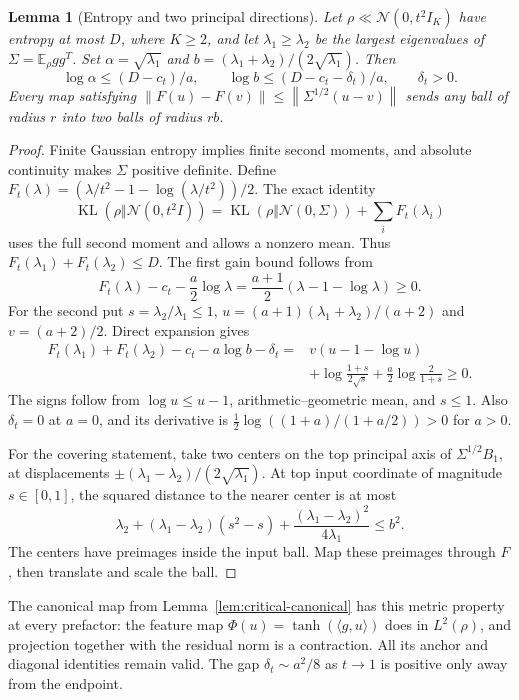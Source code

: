 \documentclass[11pt]{article}
\newtheorem{lemma}[theorem]{Lemma}
\theoremstyle{remark}
\newcommand{\E}{\mathbb E}
\newcommand{\KL}{\operatorname{KL}}
\newcommand{\norm}[1]{\left\lVert #1\right\rVert}
\begin{document}
\begin{lemma}[Entropy and two principal directions]
\label{lem:prefactor-spectral}
Let $\rho\ll\mathcal N(0,t^2I_K)$ have entropy at most $D$,
where $K\ge2$, and let $\lambda_1\ge\lambda_2$ be the largest
eigenvalues of $\Sigma=\E_\rho gg^T$. Set
$\alpha=\sqrt{\lambda_1}$ and
$b=(\lambda_1+\lambda_2)/(2\sqrt{\lambda_1})$. Then
\[
 \log\alpha\le(D-c_t)/a,\qquad
 \log b\le(D-c_t-\delta_t)/a,\qquad \delta_t>0.
\]
Every map satisfying
$\norm{F(u)-F(v)}\le\norm{\Sigma^{1/2}(u-v)}$
sends any ball of radius $r$ into two balls of radius $rb$.
\end{lemma}
\begin{proof}
Finite Gaussian entropy implies finite second moments, and absolute
continuity makes $\Sigma$ positive definite. Define
$F_t(\lambda)=(\lambda/t^2-1-\log(\lambda/t^2))/2$.
The exact identity
\[
 \KL(\rho\Vert\mathcal N(0,t^2I))
 =\KL(\rho\Vert\mathcal N(0,\Sigma))+\sum_iF_t(\lambda_i)
\]
uses the full second moment and allows a nonzero mean.
Thus $F_t(\lambda_1)+F_t(\lambda_2)\le D$.
The first gain bound follows from
\[
 F_t(\lambda)-c_t-\frac a2\log\lambda
 =\frac{a+1}2(\lambda-1-\log\lambda)\ge0.
\]
For the second put $s=\lambda_2/\lambda_1\le1$,
$u=(a+1)(\lambda_1+\lambda_2)/(a+2)$ and $v=(a+2)/2$.
Direct expansion gives
\begin{align*}
 F_t(\lambda_1)+F_t(\lambda_2)-c_t-a\log b-\delta_t
 ={}&v(u-1-\log u)\\
 &+\log\frac{1+s}{2\sqrt s}+\frac a2\log\frac2{1+s}\ge0.
\end{align*}
The signs follow from $\log u\le u-1$, arithmetic--geometric
mean, and $s\le1$. Also $\delta_t=0$ at $a=0$, and its derivative
is $\tfrac12\log((1+a)/(1+a/2))>0$ for $a>0$.

For the covering statement, take two centers on the top principal
axis of $\Sigma^{1/2}B_1$, at displacements
$\pm(\lambda_1-\lambda_2)/(2\sqrt{\lambda_1})$.
At top input coordinate of magnitude $s\in[0,1]$, the squared
distance to the nearer center is at most
\[
 \lambda_2+(\lambda_1-\lambda_2)(s^2-s)
                   +\frac{(\lambda_1-\lambda_2)^2}{4\lambda_1}
 \le b^2.
\]
The centers have preimages inside the input ball. Map these
preimages through $F$, then translate and scale the ball.
\end{proof}

The canonical map from Lemma~\ref{lem:critical-canonical}
has this metric property at every prefactor: the feature map
$\Phi(u)=\tanh(\langle g,u\rangle)$ does in $L^2(\rho)$,
and projection together with the residual norm is a contraction.
All its anchor and diagonal identities remain valid.
The gap $\delta_t\sim a^2/8$ as $t\to1$ is positive only away
from the endpoint.
\end{document}
